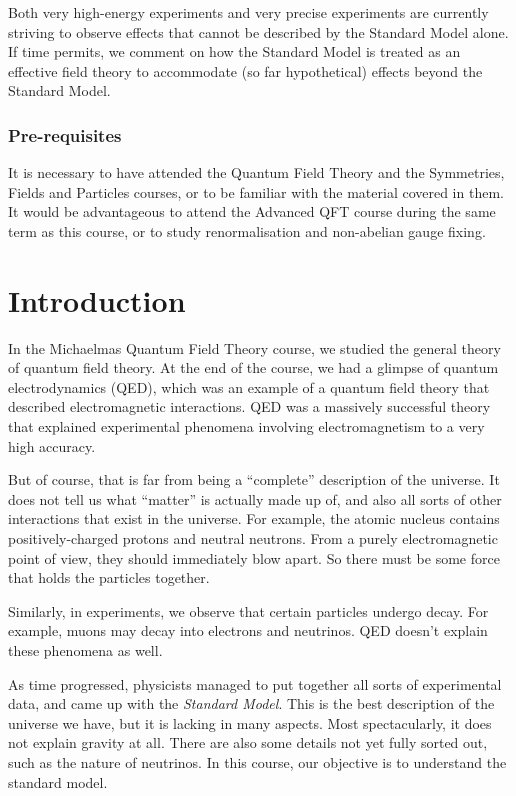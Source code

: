 \documentclass[a4paper]{article}
\begin{document}
{Both very high-energy experiments and very precise experiments are currently striving to observe effects that cannot be described by the Standard Model alone. If time permits, we comment on how the Standard Model is treated as an effective field theory to accommodate (so far hypothetical) effects beyond the Standard Model.

\subsubsection*{Pre-requisites}
It is necessary to have attended the Quantum Field Theory and the Symmetries, Fields and Particles courses, or to be familiar with the material covered in them. It would be advantageous to attend the Advanced QFT course during the same term as this course, or to study renormalisation and non-abelian gauge fixing.
}
\tableofcontents

\setcounter{section}{-1}
\section{Introduction}
In the Michaelmas Quantum Field Theory course, we studied the general theory of quantum field theory. At the end of the course, we had a glimpse of quantum electrodynamics (QED), which was an example of a quantum field theory that described electromagnetic interactions. QED was a massively successful theory that explained experimental phenomena involving electromagnetism to a very high accuracy.

But of course, that is far from being a ``complete'' description of the universe. It does not tell us what ``matter'' is actually made up of, and also all sorts of other interactions that exist in the universe. For example, the atomic nucleus contains positively-charged protons and neutral neutrons. From a purely electromagnetic point of view, they should immediately blow apart. So there must be some force that holds the particles together.

Similarly, in experiments, we observe that certain particles undergo decay. For example, muons may decay into electrons and neutrinos. QED doesn't explain these phenomena as well.

As time progressed, physicists managed to put together all sorts of experimental data, and came up with the \emph{Standard Model}. This is the best description of the universe we have, but it is lacking in many aspects. Most spectacularly, it does not explain gravity at all. There are also some details not yet fully sorted out, such as the nature of neutrinos. In this course, our objective is to understand the standard model.
\end{document}
